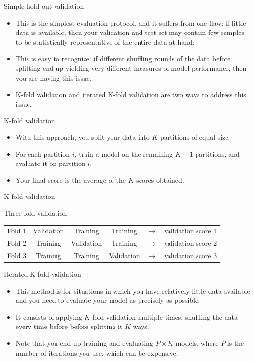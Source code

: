 \documentclass{beamer}
\begin{document}
\begin{frame}{Simple hold-out validation}
\begin{itemize}
\item This is the simplest evaluation protocol, and it suffers from one flaw: if little data is available, then your validation and test set may contain few samples to be statistically representative of the entire data at hand.
\item This is easy to recognize: if different shuffling rounds of the data before splitting end up yielding very different measures of model performance, then you are having this issue.
\item K-fold validation and iterated K-fold validation are two ways to address this issue.
\end{itemize}
\end{frame}



\begin{frame}{K-fold validation}
\begin{itemize}
\item With this approach, you split your data into $K$ partitions of equal size.
\item For each partition $i$, train a model on the remaining $K-1$ partitions, and evaluate it on partition $i$.
\item Your final score is the average of the $K$ scores obtained.
\end{itemize}
\end{frame}

\begin{frame}{K-fold validation}

Three-fold validation

\medskip
\begin{tabular}{cccccc}
Fold 1 & Validation & Training   & Training  & $\rightarrow$ & validation score 1 \\
Fold 2 & Training   & Validation & Training  & $\rightarrow$ & validation score 2 \\
Fold 3 & Training   & Training   & Validation & $\rightarrow$ & validation score 3
\end{tabular}
\end{frame}

\begin{frame}{Iterated K-fold validation}
\begin{itemize}
\item This method is for situations in which you have relatively little data available and you need to evaluate your model as precisely as possible.
\item It consists of applying $K$-fold validation multiple times, shuffling the data every time before before splitting it $K$ ways.
\item Note that you end up training and evaluating $P\times K$ models, where $P$ is the number of iterations you use, which can be expensive.
\end{itemize}
\end{frame}
\end{document}
